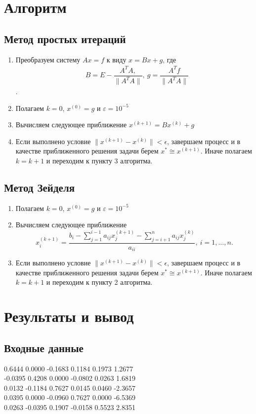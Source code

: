 \documentclass[11.4pt]{article}
\begin{document}
\section{Алгоритм}
	\subsection{Метод простых итераций}
	\begin{enumerate}
		\item Преобразуем систему $Ax=f$ к виду $x = Bx+g$, где \begin{align*}
			&B=E-\dfrac{A^TA,}{\|A^TA\|}, \:g = \dfrac{A^Tf}{\|A^TA\|}
		\end{align*}.
		\item Полагаем $k=0$, $x^{(0)}=g$ и $\varepsilon = 10^{-5}$
		\item Вычисляем следующее приближение $x^{(k+1)} = Bx^{(k)}+g$
		\item Если выполнено условие $\|x^{(k+1)}-x^{(k)}\|<\epsilon$, завершаем процесс  и в качестве приближенного решения задачи берем $x^{\ast} \cong x^{(k+1)}$. Иначе полагаем $k=k+1$ и переходим к пункту 3 алгоритма.
	\end{enumerate}
	\subsection{Метод Зейделя}
	\begin{enumerate}
		\item Полагаем $k=0$, $x^{(0)}=g$ и $\varepsilon = 10^{-5}$
		\item Вычисляем следующее приближение 
		\[x^{(k+1)}_i = \dfrac{b_i - \sum\limits_{j=1}^{i-1}a_{ij}x^{(k+1)}_j - \sum\limits_{j=i+1}^na_{ij}x^{(k)}_j}{a_{ii}}, \: i=1,\ldots,n. \]

		\item Если выполнено условие $\|x^{(k+1)}-x^{(k)}\|<\epsilon$, завершаем процесс  и в качестве приближенного решения задачи берем $x^{\ast} \cong x^{(k+1)}$. Иначе полагаем $k=k+1$ и переходим к пункту 2 алгоритма.
	\end{enumerate}
\section{Результаты и вывод}
	\subsection{Входные данные}
		0.6444 0.0000 -0.1683 0.1184 0.1973 1.2677\\
		-0.0395 0.4208 0.0000 -0.0802 0.0263 1.6819\\
		0.0132 -0.1184 0.7627 0.0145 0.0460 -2.3657\\
		0.0395 0.0000 -0.0960 0.7627 0.0000 -6.5369\\
		0.0263 -0.0395 0.1907 -0.0158 0.5523 2.8351\\
\end{document}
